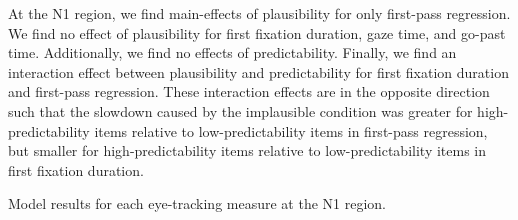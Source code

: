 \documentclass[
  12pt,
  letterpaper,
]{scrreport}
\begin{document}
At the N1 region, we find main-effects of plausibility for only
first-pass regression. We find no effect of plausibility for first
fixation duration, gaze time, and go-past time. Additionally, we find no
effects of predictability. Finally, we find an interaction effect
between plausibility and predictability for first fixation duration and
first-pass regression. These interaction effects are in the opposite
direction such that the slowdown caused by the implausible condition was
greater for high-predictability items relative to low-predictability
items in first-pass regression, but smaller for high-predictability
items relative to low-predictability items in first fixation duration.

\begin{table}

\caption{\label{tbl-fullmodelresultsn1}Model results for each
eye-tracking measure at the N1 region.}

\centering{

\centering\begingroup\fontsize{12}{14}\selectfont

}
\end{table}
\end{document}
